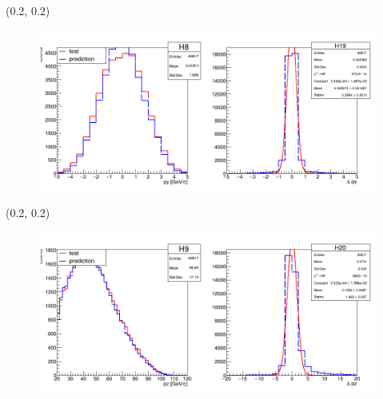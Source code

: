 \documentclass[12pt, xcolor={dvipsnames}, aspectratio = 169]{beamer}
\begin{document}
\begin{frame}

\begin{textblock}{14.0}(0.2, 0.2)
    \begin{figure}
        \centering
        \includegraphics[width=14.0cm]{../imgs/vpy.png}
    \end{figure}
\end{textblock}

\end{frame}

\begin{frame}

\begin{textblock}{14.0}(0.2, 0.2)
    \begin{figure}
        \centering
        \includegraphics[width=14.0cm]{../imgs/vpz.png}
    \end{figure}
\end{textblock}

\end{frame}
\end{document}

